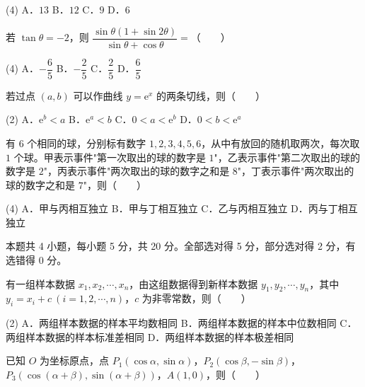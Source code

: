 \begin{gkopts}(4)
\task A．$13$
\task B．$12$
\task C．$9$
\task D．$6$
\end{gkopts}

若 $\tan\theta=-2$，则 $\dfrac{\sin\theta(1+\sin2\theta)}{\sin\theta+\cos\theta}=$（　　）

\begin{gkopts}(4)
\task A．$-\dfrac65$
\task B．$-\dfrac25$
\task C．$\dfrac25$
\task D．$\dfrac65$
\end{gkopts}

若过点 $(a,b)$ 可以作曲线 $y=\mathrm e^{x}$ 的两条切线，则（　　）

\begin{gkopts}(2)
\task A．$\mathrm e^{b}<a$
\task B．$\mathrm e^{a}<b$
\task C．$0<a<\mathrm e^{b}$
\task D．$0<b<\mathrm e^{a}$
\end{gkopts}

有 $6$ 个相同的球，分别标有数字 $1,2,3,4,5,6$，从中有放回的随机取两次，每次取 $1$ 个球。甲表示事件"第一次取出的球的数字是 $1$"，乙表示事件"第二次取出的球的数字是 $2$"，丙表示事件"两次取出的球的数字之和是 $8$"，丁表示事件"两次取出的球的数字之和是 $7$"，则（　　）

\begin{gkopts}(4)
\task A．甲与丙相互独立
\task B．甲与丁相互独立
\task C．乙与丙相互独立
\task D．丙与丁相互独立
\end{gkopts}

\par\medskip


\begin{gktip}
本题共 4 小题，每小题 5 分，共 20 分。全部选对得 5 分，部分选对得 2 分，有选错得 0 分。
\end{gktip}

有一组样本数据 $x_1,x_2,\cdots,x_n$，由这组数据得到新样本数据 $y_1,y_2,\cdots,y_n$，其中 $y_i=x_i+c\ (i=1,2,\cdots,n)$，$c$ 为非零常数，则（　　）

\begin{gkopts}(2)
\task A．两组样本数据的样本平均数相同
\task B．两组样本数据的样本中位数相同
\task C．两组样本数据的样本标准差相同
\task D．两组样本数据的样本极差相同
\end{gkopts}

已知 $O$ 为坐标原点，点 $P_1(\cos\alpha,\sin\alpha)$，$P_2(\cos\beta,-\sin\beta)$，$P_3(\cos(\alpha+\beta),\sin(\alpha+\beta))$，$A(1,0)$，则（　　）

